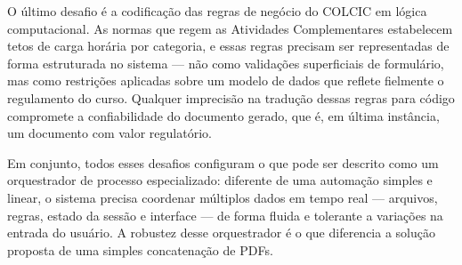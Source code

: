 O último desafio é a codificação das regras de negócio do COLCIC em lógica computacional. As normas que regem as Atividades Complementares estabelecem tetos de carga horária por categoria, e essas regras precisam ser representadas de forma estruturada no sistema — não como validações superficiais de formulário, mas como restrições aplicadas sobre um modelo de dados que reflete fielmente o regulamento do curso. Qualquer imprecisão na tradução dessas regras para código compromete a confiabilidade do documento gerado, que é, em última instância, um documento com valor regulatório.


Em conjunto, todos esses desafios configuram o que pode ser descrito como um orquestrador de processo especializado: diferente de uma automação simples e linear, o sistema precisa coordenar múltiplos dados em tempo real — arquivos, regras, estado da sessão e interface — de forma fluida e tolerante a variações na entrada do usuário. A robustez desse orquestrador é o que diferencia a solução proposta de uma simples concatenação de PDFs.

